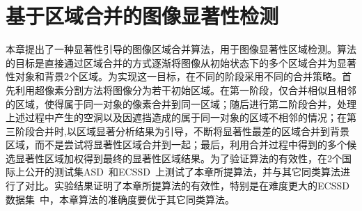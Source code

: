 

\chapter{基于区域合并的图像显著性检测}
\label{ch2:SGRM}
本章提出了一种显著性引导的图像区域合并算法，用于图像显著性区域检测。算法的目标是直接通过区域合并的方式逐渐将图像从初始状态下的多个区域合并为显著性对象和背景2个区域。为实现这一目标，在不同的阶段采用不同的合并策略。首先利用超像素分割方法将图像分为若干初始区域。在第一阶段，仅合并相似且相邻的区域，使得属于同一对象的像素合并到同一区域；随后进行第二阶段合并，处理上述过程中产生的空洞以及因遮挡造成的属于同一对象的区域不相邻的情况；在第三阶段合并时,以区域显著分析结果为引导，不断将显著性最差的区域合并到背景区域，而不是尝试将显著性区域合并到一起；最后，利用合并过程中得到的多个候选显著性区域加权得到最终的显著性区域结果。为了验证算法的有效性，在2个国际上公开的测试集ASD~\cite{Achanta08}和ECSSD~\cite{ECSSD}上测试了本章所提算法，并与其它同类算法进行了对比。实验结果证明了本章所提算法的有效性，特别是在难度更大的ECSSD数据集~\cite{ECSSD}中，本章算法的准确度要优于其它同类算法。
